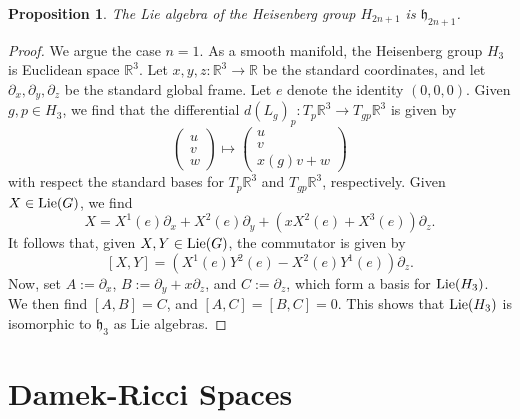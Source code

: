 \documentclass{amsart}[]
\newcommand{\R}{\mathbb R}
\newcommand{\lie}{\text{\normalfont Lie}}
\theoremstyle{plain}
\newtheorem{proposition}[theorem]{Proposition}
\theoremstyle{definition}
\theoremstyle{remark}
\begin{document}
	\begin{proposition}
		The Lie algebra of the Heisenberg group $H_{2n+1}$ is $\mathfrak h_{2n+1}$.
	\end{proposition}
	\begin{proof}
		We argue the case $n = 1$. As a smooth manifold, the Heisenberg group $H_3$ is Euclidean space $\R^3$. Let $x,y,z:\R^3 \rightarrow \R$ be the standard coordinates, and let $\partial_x,\partial_y, \partial_z$ be the standard global frame. Let $e$ denote the identity $(0,0,0)$.
		Given $g,p \in H_3$, we find that the differential $d(L_g)_p:T_p\R^3 \rightarrow T_{gp} \R^3$ is given by 
		$$\begin{pmatrix}
			u \\ v \\ w
		\end{pmatrix} \mapsto 
		\begin{pmatrix}
			u \\ v \\x(g) v + w
		\end{pmatrix}$$
		with respect the standard bases for $T_p \R^3$ and $T_{gp} \R^3$, respectively.
		Given $X  \in \lie(G)$, we find 
		$$X = X^1(e) \partial_x + X^2(e) \partial_y + (x X^2(e) + X^3(e))\partial_z.$$
		It follows that, given $X,Y \in \lie(G)$, the commutator is given by 
		$$[X,Y] = (X^1(e) Y^2(e) - X^2(e) Y^1(e)) \partial_z.$$
		Now, set 
		$A := \partial_x$, $B := \partial_y + x \partial_z$,  and $C:= \partial_z$, which form a basis for $\lie(H_3)$.
		We then find $[A,B] = C$, and $[A,C] = [B,C] = 0$. This shows that $\lie(H_3)$ is isomorphic to $\mathfrak h_3$ as Lie algebras.
	\end{proof}


\section{Damek-Ricci Spaces}
\end{document}
